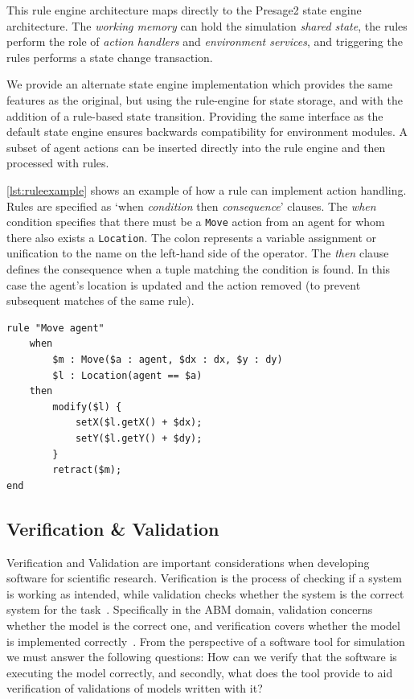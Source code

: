 This rule engine architecture maps directly to the Presage2 state engine
architecture. The \emph{working memory} can hold the simulation \emph{shared
state}, the rules perform the role of \emph{action handlers} and \emph{
environment services}, and triggering the rules performs a state change
transaction.

We provide an alternate state engine implementation which provides the same
features as the original, but using the rule-engine for state storage, and
with the addition of a rule-based state transition. Providing the same
interface as the default state engine ensures backwards compatibility for
environment modules. A subset of agent actions can be inserted directly into
the rule engine and then processed with rules.

\autoref{lst:ruleexample} shows an example of how a rule can implement action
handling. Rules are specified as `when \emph{condition} then
\emph{consequence}' clauses. The \emph{when} condition specifies that there
must be a \texttt{Move} action from an agent for whom there also exists a
\texttt{Location}. The colon represents a variable assignment or unification
to the name on the left-hand side of the operator. The \emph{then} clause
defines the consequence when a tuple matching the condition is found. In this
case the agent's location is updated and the action removed (to prevent
subsequent matches of the same rule).

\begin{lstlisting}[caption={Drools rule example.},label=lst:ruleexample,float=tbph]
rule "Move agent"
    when
        $m : Move($a : agent, $dx : dx, $y : dy)
        $l : Location(agent == $a)
    then
        modify($l) {
            setX($l.getX() + $dx);
            setY($l.getY() + $dy);
        }
        retract($m);
end
\end{lstlisting}

\subsection{Verification \& Validation}

Verification and Validation are important considerations when developing
software for scientific research. Verification is the process of checking if a
system is working as intended, while validation checks whether the system is
the correct system for the task~\citep{Wallace1989}. Specifically in the \ac{ABM}
domain, validation concerns whether the model is the correct one, and
verification covers whether the model is implemented
correctly~\citep{Ormerod2009}. From the perspective of a software tool for
simulation we must answer the following questions: How can we verify that the
software is executing the model correctly, and secondly, what does the tool
provide to aid verification of validations of models written with it?

